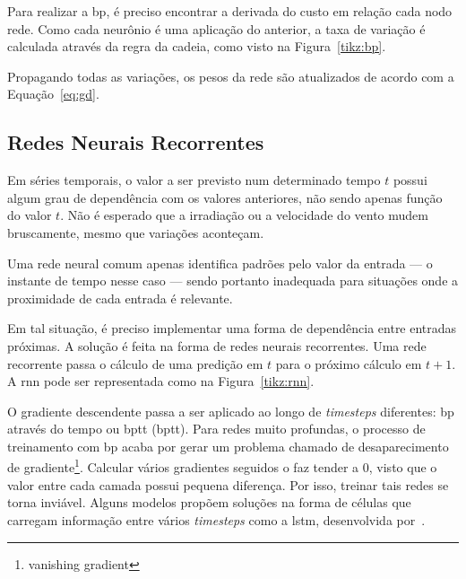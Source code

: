 Para realizar a \acrshort{bp}, é preciso encontrar a derivada do custo
em relação cada nodo rede. Como cada neurônio é uma aplicação do anterior, a
taxa de variação é calculada através da regra da cadeia, como visto na
Figura~\ref{tikz:bp}.



Propagando todas as variações, os pesos da rede são atualizados de acordo com a
Equação~\ref{eq:gd}.

\subsection{Redes Neurais Recorrentes}

Em séries temporais, o valor a ser previsto num determinado tempo $t$ possui
algum grau de dependência com os valores anteriores, não sendo apenas função do
valor $t$. Não é esperado que a irradiação ou a velocidade do vento mudem
bruscamente, mesmo que variações aconteçam.

Uma rede neural comum apenas identifica padrões pelo valor da entrada --- o
instante de tempo nesse caso --- sendo portanto inadequada para situações onde a
proximidade de cada entrada é relevante.

Em tal situação, é preciso implementar uma forma de dependência entre entradas
próximas.  A solução é feita na forma de redes neurais recorrentes. Uma rede
recorrente passa o cálculo de uma predição em $t$ para o próximo cálculo
em $t+1$. A \acrshort{rnn} pode ser representada como na Figura~\ref{tikz:rnn}.



O gradiente descendente passa a ser aplicado ao longo de \emph{timesteps}
diferentes: \acrshort{bp} através do tempo ou \acrlong{bptt} (\acrshort{bptt}).
Para redes muito profundas, o processo de treinamento com \acrshort{bp} acaba
por gerar um problema chamado de desaparecimento de
gradiente\footnote{vanishing gradient}. Calcular vários gradientes seguidos o
faz tender a 0, visto que o valor entre cada camada possui pequena diferença.
Por isso, treinar tais redes se torna inviável. Alguns modelos propõem soluções
na forma de células que carregam informação entre vários \emph{timesteps} como a
\acrshort{lstm}, desenvolvida por~\cite{hochreiter1997long}.
